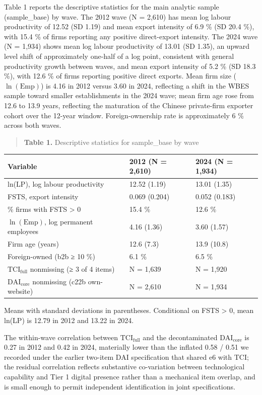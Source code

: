 \documentclass[12pt,a4paper]{article}
\begin{document}
Table 1 reports the descriptive statistics for the main analytic sample
(sample\_base) by wave. The 2012 wave (N = 2,610) has mean log labour
productivity of 12.52 (SD 1.19) and mean export intensity of 6.9 \% (SD
20.4 \%), with 15.4 \% of firms reporting any positive direct-export
intensity. The 2024 wave (N = 1,934) shows mean log labour productivity
of 13.01 (SD 1.35), an upward level shift of approximately one-half of a
log point, consistent with general productivity growth between waves,
and mean export intensity of 5.2 \% (SD 18.3 \%), with 12.6 \% of firms
reporting positive direct exports. Mean firm size
(\(\ln(\mathrm{Emp})\)) is 4.16 in 2012 versus 3.60 in 2024, reflecting
a shift in the WBES sample toward smaller establishments in the 2024
wave; mean firm age rose from 12.6 to 13.9 years, reflecting the
maturation of the Chinese private-firm exporter cohort over the 12-year
window. Foreign-ownership rate is approximately 6 \% across both waves.

\begin{quote}
\textbf{Table 1.} Descriptive statistics for sample\_base by wave
\end{quote}

\begin{longtable}[]{@{}lll@{}}
\toprule\noalign{}
Variable & 2012 (N = 2,610) & 2024 (N = 1,934) \\
\midrule\noalign{}
\endhead
\bottomrule\noalign{}
\endlastfoot
ln(LP), log labour productivity & 12.52 (1.19) & 13.01 (1.35) \\
FSTS, export intensity & 0.069 (0.204) & 0.052 (0.183) \\
\% firms with FSTS \textgreater{} 0 & 15.4 \% & 12.6 \% \\
\(\ln(\mathrm{Emp})\), log permanent employees & 4.16 (1.36) & 3.60
(1.57) \\
Firm age (years) & 12.6 (7.3) & 13.9 (10.8) \\
Foreign-owned (b2b ≥ 10 \%) & 6.1 \% & 6.5 \% \\
\(\mathrm{TCI}_{\text{full}}\) nonmissing (≥ 3 of 4 items) & N = 1,639 &
N = 1,920 \\
\(\mathrm{DAI}_{\text{core}}\) nonmissing (c22b own-website) & N = 2,610
& N = 1,934 \\
\end{longtable}

Means with standard deviations in parentheses. Conditional on FSTS
\textgreater{} 0, mean ln(LP) is 12.79 in 2012 and 13.22 in 2024.

The within-wave correlation between \(\mathrm{TCI}_{\text{full}}\) and
the decontaminated \(\mathrm{DAI}_{\text{core}}\) is 0.27 in 2012 and
0.42 in 2024, materially lower than the inflated 0.58 / 0.51 we recorded
under the earlier two-item DAI specification that shared e6 with TCI;
the residual correlation reflects substantive co-variation between
technological capability and Tier 1 digital presence rather than a
mechanical item overlap, and is small enough to permit independent
identification in joint specifications.
\end{document}
